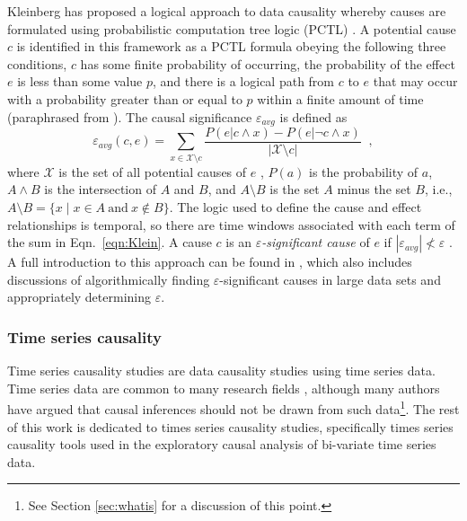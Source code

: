 \documentclass{article}[10pt]
\begin{document}
Kleinberg has proposed a logical approach to data causality whereby causes are formulated using probabilistic computation tree logic (PCTL) \cite{Kleinberg2009,Kleinberg2011,Kleinberg2012}.  A potential cause $c$ is identified in this framework as a PCTL formula obeying the following three conditions, $c$ has some finite probability of occurring, the probability of the effect $e$ is less than some value $p$, and there is a logical path from $c$ to $e$ that may occur with a probability greater than or equal to $p$ within a finite amount of time (paraphrased from \cite{Kleinberg2011}).  The causal significance $\varepsilon_{avg}$ is defined as
\begin{equation}
\label{eqn:Klein}
\varepsilon_{avg}(c,e) = \sum_{x\in \mathcal{X}\setminus c} \frac{P(e|c\wedge x) - P(e|\neg c\wedge x)}{|\mathcal{X}\setminus c|}\;\;,
\end{equation}
where $\mathcal{X}$ is the set of all potential causes of $e$ \cite{Kleinberg2011,Kleinberg2009}, $P(a)$ is the probability of $a$, $A\wedge B$ is the intersection of $A$ and $B$, and $A\setminus B$ is the set $A$ minus the set $B$, i.e., $A\setminus B = \{x\;|\;x\in A\mathrm{\ and\ }x\not\in B\}$.  The logic used to define the cause and effect relationships is temporal, so there are time windows associated with each term of the sum in Eqn.\ \ref{eqn:Klein}.  A cause $c$ is an {\em $\varepsilon$-significant cause} of $e$ if $|\varepsilon_{avg}|\nless\varepsilon$ \cite{Kleinberg2011}.  A full introduction to this approach can be found in \cite{Kleinberg2012}, which also includes discussions of algorithmically finding $\varepsilon$-significant causes in large data sets and appropriately determining $\varepsilon$.  

\subsubsection{Time series causality} 
Time series causality studies are data causality studies using time series data.  Time series data are common to many research fields \cite{ITbook_placeholder,Box2013}, although many authors have argued that causal inferences should not be drawn from such data\footnote{See Section \ref{sec:whatis} for a discussion of this point.}.  The rest of this work is dedicated to times series causality studies, specifically times series causality tools used in the exploratory causal analysis of bi-variate time series data.  
\end{document}
